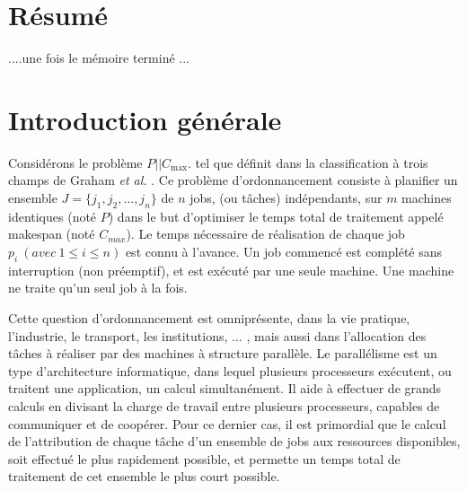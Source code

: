 \documentclass[a4paper,12pt]{report}
\theoremstyle{plain}				%
\theoremstyle{definition}				%
\newcommand\problemGrahamP{$P||C_{\max}$\xspace}
\begin{document}
\bigskip
{}
\section*{Résumé} \label{sec:resume}
....une fois le mémoire terminé ...

\bigskip


\section{Introduction générale} \label{sec:introductionGenerale}

Considérons le problème \problemGrahamP. tel que définit 
  dans la classification à trois champs de 
  Graham \emph{et al.} \cite{graham1979optimization}. 
Ce problème d'ordonnancement consiste à planifier 
  un ensemble $J=\{j_1, j_2, \ldots, j_n\}$ de $n$ jobs, (ou tâches) indépendants, 
  sur $m$ machines identiques (noté $P$) 
  dans le but d'optimiser le temps total de traitement appelé makespan 
  (noté $C_{max}$).
Le temps nécessaire de réalisation de chaque job $p_i~(avec~1 \leq i \leq n)$ 
  est connu à l'avance. 
Un job commencé est complété sans interruption (non préemptif), 
  et est exécuté par une seule machine. 
Une machine ne traite qu'un seul job à la fois. 

Cette question d’ordonnancement est omniprésente, dans la vie 
  pratique, l'industrie, le transport, les institutions, $\ldots$ , 
  mais aussi dans l'allocation des tâches à réaliser par des 
  machines à structure parallèle. 
Le parallélisme est un type d'architecture informatique, dans lequel 
  plusieurs processeurs exécutent, ou traitent
  une application, un calcul simultanément. 
Il aide à effectuer de grands calculs en divisant la charge de travail 
  entre plusieurs processeurs, capables de communiquer et de coopérer. 
Pour ce dernier cas, il est primordial que le calcul de l'attribution 
  de chaque tâche d'un ensemble de jobs aux ressources disponibles, 
  soit effectué le plus rapidement possible, 
  et permette un temps total de traitement de cet ensemble 
  le plus court possible.
\end{document}

